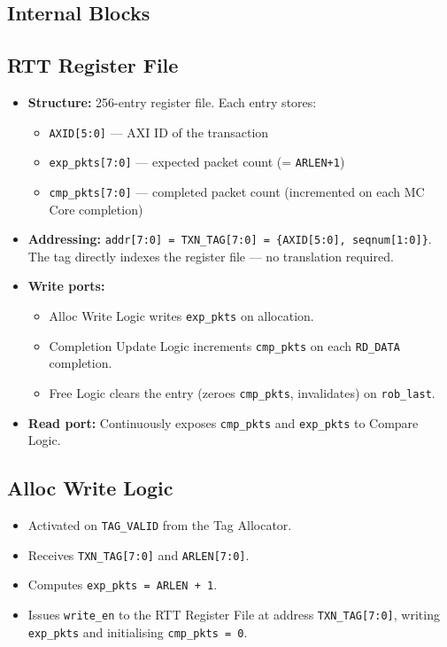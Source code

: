 \subsection{Internal Blocks}

\subsection{RTT Register File}

\begin{itemize}
  \item \textbf{Structure:} 256-entry register file. Each entry stores:
  \begin{itemize}
    \item \texttt{AXID[5:0]} — AXI ID of the transaction
    \item \texttt{exp\_pkts[7:0]} — expected packet count (= \texttt{ARLEN+1})
    \item \texttt{cmp\_pkts[7:0]} — completed packet count (incremented on each MC Core completion)
  \end{itemize}
  \item \textbf{Addressing:} \texttt{addr[7:0] = TXN\_TAG[7:0] = \{AXID[5:0], seqnum[1:0]\}}.
        The tag directly indexes the register file — no translation required.
  \item \textbf{Write ports:}
  \begin{itemize}
    \item Alloc Write Logic writes \texttt{exp\_pkts} on allocation.
    \item Completion Update Logic increments \texttt{cmp\_pkts} on each
          \texttt{RD\_DATA} completion.
    \item Free Logic clears the entry (zeroes \texttt{cmp\_pkts}, invalidates)
          on \texttt{rob\_last}.
  \end{itemize}
  \item \textbf{Read port:} Continuously exposes \texttt{cmp\_pkts} and
        \texttt{exp\_pkts} to Compare Logic.
\end{itemize}

\subsection{Alloc Write Logic}

\begin{itemize}
  \item Activated on \texttt{TAG\_VALID} from the Tag Allocator.
  \item Receives \texttt{TXN\_TAG[7:0]} and \texttt{ARLEN[7:0]}.
  \item Computes \texttt{exp\_pkts = ARLEN + 1}.
  \item Issues \texttt{write\_en} to the RTT Register File at address
        \texttt{TXN\_TAG[7:0]}, writing \texttt{exp\_pkts} and
        initialising \texttt{cmp\_pkts = 0}.
\end{itemize}

